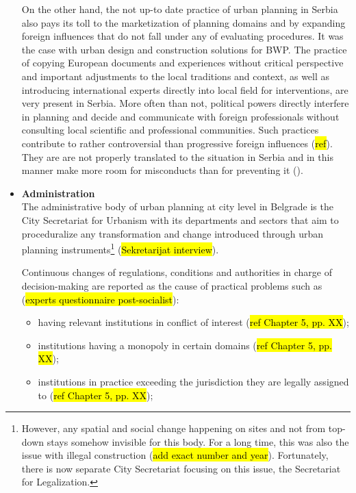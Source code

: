 \documentclass[11pt]{report}
\begin{document}
\begin{itemize}
On the other hand, the not up-to date practice of urban planning in Serbia also pays its toll to the marketization of planning domains and by expanding foreign influences that do not fall under any of evaluating procedures.
It was the case with urban design and construction solutions for BWP.
The practice of copying European documents and experiences without critical perspective and important adjustments to the local traditions and context, as well as introducing international experts directly into local field for interventions, are very present in Serbia.
More often than not, political powers directly interfere in planning and decide and communicate with foreign professionals without consulting local scientific and professional communities.
Such practices contribute to rather controversial than progressive foreign influences (\hl{ref}). They are are not properly translated to the situation in Serbia and in this manner make more room for misconducts than for preventing it (\cite{Vujosevic 2012}).
\\

\item \textbf{Administration}
\\
The administrative body of urban planning at city level in Belgrade is the City Secretariat for Urbanism with its departments and sectors that aim to proceduralize any transformation and change introduced through urban planning instruments\footnote{However, any spatial and social change happening on sites and not from top-down stays somehow invisible for this body. For a long time, this was also the issue with illegal construction (\hl{add exact number and year}). Fortunately, there is now separate City Secretariat focusing on this issue, the Secretariat for Legalization.}
(\hl{Sekretarijat interview}).

Continuous changes of regulations, conditions and authorities in charge of decision-making are reported as the cause of practical problems such as (\hl{experts questionnaire post-socialist}):

\begin{itemize}
\item having relevant institutions in conflict of interest (\hl{ref Chapter 5, pp. XX}); 
\item institutions having a monopoly in certain domains (\hl{ref Chapter 5, pp. XX});
\item institutions in practice exceeding the jurisdiction they are legally assigned to (\hl{ref Chapter 5, pp. XX});
\end{itemize}


\end{itemize}
\end{document}
